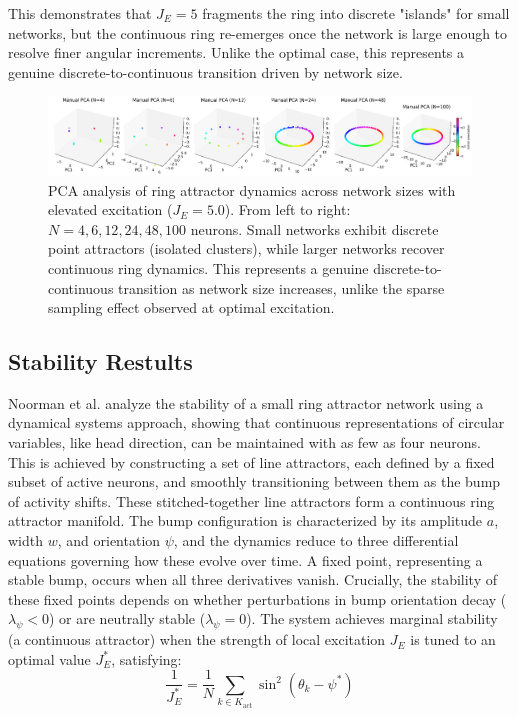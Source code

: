 \documentclass[11pt,a4paper]{article}
\begin{document}
This demonstrates that $J_E = 5$ fragments the ring into discrete "islands" for small networks, but the continuous ring re-emerges once the network is large enough to resolve finer angular increments. Unlike the optimal case, this represents a genuine discrete-to-continuous transition driven by network size.

\begin{figure}[H]
\centering
\includegraphics[width=1.0\textwidth]{manual_pca_varying_N_point.png}
\caption{PCA analysis of ring attractor dynamics across network sizes with elevated excitation ($J_E = 5.0$). From left to right: $N = 4, 6, 12, 24, 48, 100$ neurons. Small networks exhibit discrete point attractors (isolated clusters), while larger networks recover continuous ring dynamics. This represents a genuine discrete-to-continuous transition as network size increases, unlike the sparse sampling effect observed at optimal excitation.}
\label{fig:network_size_elevated}
\end{figure}


\subsection{Stability Restults}

Noorman et al. analyze the stability of a small ring attractor network using a dynamical systems approach, showing that continuous representations of circular variables, like head direction, can be maintained with as few as four neurons. This is achieved by constructing a set of line attractors, each defined by a fixed subset of active neurons, and smoothly transitioning between them as the bump of activity shifts. These stitched-together line attractors form a continuous ring attractor manifold. The bump configuration is characterized by its amplitude \( a \), width \( w \), and orientation \( \psi \), and the dynamics reduce to three differential equations governing how these evolve over time. A fixed point, representing a stable bump, occurs when all three derivatives vanish. Crucially, the stability of these fixed points depends on whether perturbations in bump orientation decay (\( \lambda_\psi < 0 \)) or are neutrally stable (\( \lambda_\psi = 0 \)). The system achieves marginal stability (a continuous attractor) when the strength of local excitation \( J_E \) is tuned to an optimal value \( J_E^* \), satisfying:
\begin{equation}
\frac{1}{J_E^*} = \frac{1}{N} \sum_{k \in K_{\text{act}}} \sin^2(\theta_k - \psi^*)
\end{equation}
\end{document}
